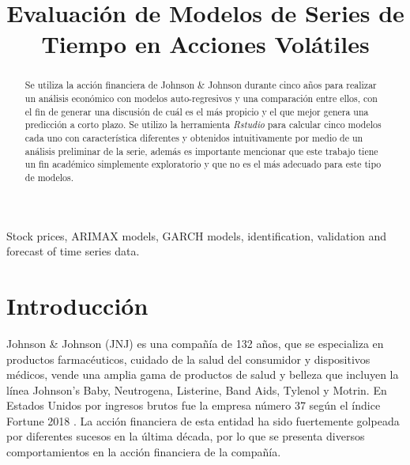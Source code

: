 \documentclass[conference]{IEEEtran}
\begin{document}
\title{Evaluación de Modelos de Series de Tiempo en Acciones Volátiles}
\author{

\and

}

\maketitle

\begin{abstract}
Se utiliza la acción financiera de Johnson \& Johnson durante cinco años para realizar un análisis económico con modelos auto-regresivos y una comparación entre ellos, con el fin de generar una discusión de cuál es el más propicio y el que mejor genera una predicción a corto plazo. Se utilizo la herramienta \textit{Rstudio} para calcular cinco modelos cada uno con característica diferentes y obtenidos intuitivamente por medio de un análisis preliminar de la serie, además es importante mencionar que este trabajo tiene un fin académico simplemente exploratorio y que no es el más adecuado para este tipo de modelos. 
\end{abstract}

\begin{IEEEkeywords}
Stock prices, ARIMAX models, GARCH models, identification, validation and forecast of time series data.
\end{IEEEkeywords}

\section{Introducción}
Johnson \& Johnson (JNJ) es una compañía de 132 años, que se especializa en productos farmacéuticos, cuidado de la salud del consumidor y dispositivos médicos, vende una amplia gama de productos de salud y belleza que incluyen la línea Johnson's Baby, Neutrogena, Listerine, Band Aids, Tylenol y Motrin. En Estados Unidos por ingresos brutos fue la empresa número 37 según el índice Fortune 2018 \cite{fortune2018}. La acción financiera de esta entidad ha sido fuertemente golpeada por diferentes sucesos en la última década, por lo que se presenta diversos comportamientos en la acción financiera de la compañía.  
\end{document}
